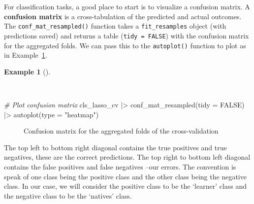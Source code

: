 \documentclass[
  letterpaper,
]{latex/krantz}
\newenvironment{Shaded}{\begin{snugshade}}{\end{snugshade}}
\newcommand{\AttributeTok}[1]{\textcolor[rgb]{0.00,0.00,0.00}{#1}}
\newcommand{\CommentTok}[1]{\textcolor[rgb]{0.00,0.00,0.00}{\textit{#1}}}
\newcommand{\ConstantTok}[1]{\textcolor[rgb]{0.00,0.00,0.00}{#1}}
\newcommand{\FunctionTok}[1]{\textcolor[rgb]{0.00,0.00,0.00}{#1}}
\newcommand{\NormalTok}[1]{\textcolor[rgb]{0.00,0.00,0.00}{#1}}
\newcommand{\SpecialCharTok}[1]{\textcolor[rgb]{0.00,0.00,0.00}{#1}}
\newcommand{\StringTok}[1]{\textcolor[rgb]{0.00,0.00,0.00}{#1}}
\theoremstyle{definition}
\newtheorem{example}{Example}[chapter]
\theoremstyle{remark}
\begin{document}
For classification tasks, a good place to start is to visualize a
confusion matrix. A \textbf{confusion matrix} is a cross-tabulation of
the predicted and actual outcomes. The \texttt{conf\_mat\_resampled()}
function takes a \texttt{fit\_resamples} object (with predictions saved)
and returns a table (\texttt{tidy\ =\ FALSE}) with the confusion matrix
for the aggregated folds. We can pass this to the \texttt{autoplot()}
function to plot as in
Example~\ref{exm-predict-class-tune-hyperparameters-evaluate-workflow-cv-confusion}.

\begin{example}[]\protect\hypertarget{exm-predict-class-tune-hyperparameters-evaluate-workflow-cv-confusion}{}\label{exm-predict-class-tune-hyperparameters-evaluate-workflow-cv-confusion}

~

\begin{Shaded}
\begin{Highlighting}[]
\CommentTok{\# Plot confusion matrix}
\NormalTok{cls\_lasso\_cv }\SpecialCharTok{|\textgreater{}}
  \FunctionTok{conf\_mat\_resampled}\NormalTok{(}\AttributeTok{tidy =} \ConstantTok{FALSE}\NormalTok{) }\SpecialCharTok{|\textgreater{}}
  \FunctionTok{autoplot}\NormalTok{(}\AttributeTok{type =} \StringTok{"heatmap"}\NormalTok{)}
\end{Highlighting}
\end{Shaded}

\begin{figure}[!htb]


\caption{\label{fig-class-tune-hyperparameters-evaluate-workflow-cv-confusion}Confusion
matrix for the aggregated folds of the cross-validation}

\end{figure}%

\end{example}

The top left to bottom right diagonal contains the true positives and
true negatives, these are the correct predictions. The top right to
bottom left diagonal contains the false positives and false negatives
--our errors. The convention is speak of one class being the positive
class and the other class being the negative class. In our case, we will
consider the positive class to be the `learner' class and the negative
class to be the `natives' class.
\end{document}
